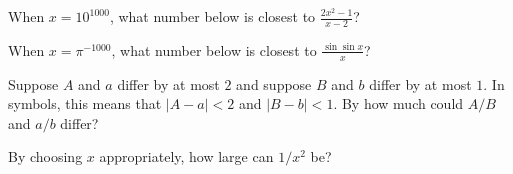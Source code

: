 \documentclass{ximera}
\begin{document}
\begin{shuffle}
\begin{problem}
  When $x = 10^{1000}$, what number below is closest to $\frac{2x^2 - 1}{x-2}$? %
  \begin{multipleChoice}
  \end{multipleChoice}
\end{problem}

\begin{problem}
  When $x = \pi^{-1000}$, what number below is closest to $\frac{\sin \sin x}{x}$?
  \begin{multipleChoice}
  \end{multipleChoice}
\end{problem}

\begin{problem}
  Suppose $A$ and $a$ differ by at most $2$ and suppose $B$ and $b$
  differ by at most $1$.  In symbols, this means that $|A - a| < 2$ and $|B - b| < 1$.
  By how much could $A/B$ and $a/b$ differ?
  \begin{multipleChoice}
  \end{multipleChoice}
\end{problem}

\begin{problem}
  By choosing $x$ appropriately, how large can $1/x^2$ be?
  \begin{multipleChoice}
  \end{multipleChoice}
\end{problem}


\end{shuffle}
\end{document}
